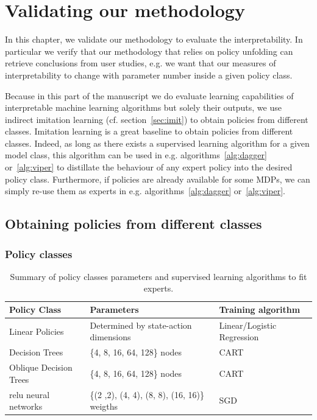 \chapter{Validating our methodology}\label{sec:exps1}

In this chapter, we validate our methodology to evaluate the interpretability.
In particular we verify that our methodology that relies on policy unfolding can retrieve conclusions from user studies, e.g. we want that our measures of interpretability to change with parameter number inside a given policy class.

Because in this part of the manuscript we do evaluate learning capabilities of interpretable machine learning algorithms but solely their outputs, we use indirect imitation learning (cf. section~\ref{sec:imit}) to obtain policies from different classes.
Imitation learning is a great baseline to obtain policies from different classes.
Indeed, as long as there exists a supervised learning algorithm for a given model class, this algorithm can be used in e.g. algorithms~\ref{alg:dagger} or~\ref{alg:viper} to distillate the behaviour of any expert policy into the desired policy class. 
Furthermore, if policies are already available for some MDPs, we can simply re-use them as experts in e.g. algorithms~\ref{alg:dagger} or~\ref{alg:viper}.

\section{Obtaining policies from different classes}

\subsection{Policy classes}
\begin{table}[ht]
\centering
\small
\begin{tabular}{lll}
\hline
\textbf{Policy Class} & \textbf{Parameters} & \textbf{Training algorithm} \\
\hline
Linear Policies & Determined by state-action dimensions & Linear/Logistic Regression \\
Decision Trees & \{4, 8, 16, 64, 128\} nodes & CART \\
Oblique Decision Trees & \{4, 8, 16, 64, 128\} nodes & CART \\
relu neural networks & \{(2 ,2), (4, 4), (8, 8), (16, 16)\} weigths & SGD \\
\hline
\end{tabular}
\caption{Summary of policy classes parameters and supervised learning algorithms to fit experts.}
\label{tab:policy-classes}
\end{table}

